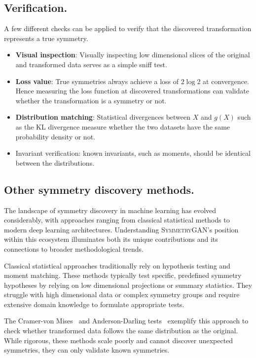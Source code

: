     \subsection{Verification.}
    A few different checks can be applied to verify that the discovered transformation represents a true symmetry.
    \begin{itemize}
        \item \textbf{Visual inspection}: Visually inspecting low dimensional slices of the original and transformed data serves as a simple sniff test.
        \item \textbf{Loss value}: True symmetries always achieve a loss of \(2\log2\) at convergence. Hence measuring the loss function at discovered transformations can validate whether the transformation is a symmetry or not.
        \item \textbf{Distribution matching}: Statistical divergences between \(X\) and \(g(X)\) such as the KL divergence measure whether the two datasets have the same probability density or not.
        \item Invariant verification: known invariants, such as moments, should be identical between the distributions.
    \end{itemize}
    
    \subsection{Other symmetry discovery methods.}
        The landscape of symmetry discovery in machine learning has evolved considerably, with approaches ranging from classical statistical methods to modern deep learning architectures.
        Understanding \textsc{SymmetryGAN}'s position within this ecosystem illuminates both its unique contributions and its connections to broader methodological trends.

        Classical statistical approaches traditionally rely on hypothesis testing and moment matching.
        These methods typically test specific, predefined symmetry hypotheses by relying on low dimensional projections or summary statistics.
        They struggle with high dimensional data or complex symmetry groups and require extensive domain knowledge to formulate appropriate tests.

        The Cramer-von Mises~\cite{von_mises_wahrscheinlichkeit_1928, cramer_composition_1928} and Anderson-Darling tests~\cite{anderson_asymptotic_1952} exemplify this approach to check whether transformed data follows the same distribution as the original.
        While rigorous, these methods scale poorly and cannot discover unexpected symmetries, they can only validate known symmetries.

